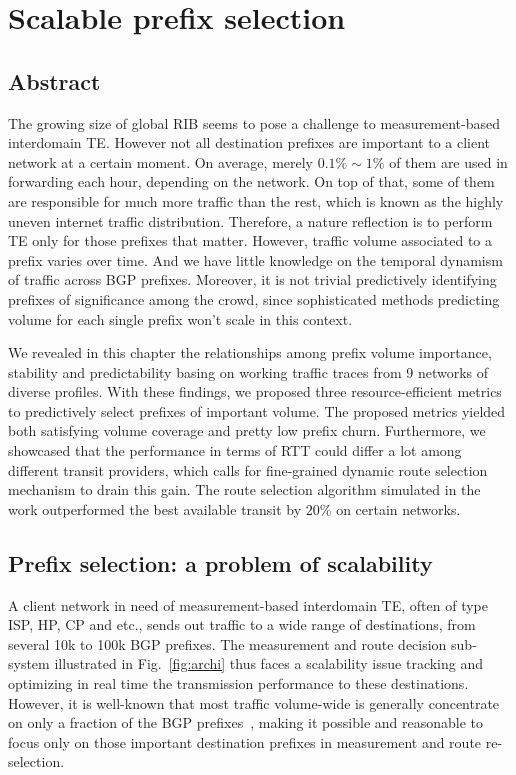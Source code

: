 \chapter{Scalable prefix selection}
\label{sec:pref_selec}

\section*{Abstract}
The growing size of global \acf{RIB} seems to pose a challenge to measurement-based interdomain \acf{TE}. However not all destination prefixes are important to a client network at a certain moment. On average, merely $0.1\% \sim 1\%$ of them are used in forwarding each hour, depending on the network. On top of that, some of them are responsible for much more traffic than the rest, which is known as the highly uneven internet traffic distribution.
Therefore, a nature reflection is to perform TE only for those prefixes that matter.
However, traffic volume associated to a prefix varies over time. And we have little knowledge on the temporal dynamism of traffic across \acf{BGP} prefixes. 
Moreover, it is not trivial predictively identifying prefixes of significance among the crowd, since sophisticated methods predicting volume for each single prefix won't scale in this context.

We revealed in this chapter the relationships among prefix volume importance, stability and predictability basing on working traffic traces from 9 networks of diverse profiles. 
With these findings, we proposed three resource-efficient metrics to predictively select prefixes of important volume. The proposed metrics yielded both satisfying volume coverage and pretty low prefix churn. Furthermore, we showcased that the performance in terms of RTT could differ a lot among different transit providers, which calls for fine-grained dynamic route selection mechanism to drain this gain. The route selection algorithm simulated in the work outperformed the best available transit by $20\%$ on certain networks. 
\clearpage

\section{Prefix selection: a problem of scalability}
A client network in need of measurement-based interdomain \acf{TE}, often of type \acf{ISP}, \acf{HP}, \acf{CP} and etc., sends out traffic to a wide range of destinations, from several 10k to 100k BGP prefixes.
The measurement and route decision sub-system illustrated in Fig.~\ref{fig:archi} thus faces a scalability issue tracking and optimizing in real time the transmission performance to these destinations.
However, it is well-known that most traffic volume-wide is generally concentrate on only a fraction of the BGP prefixes~\cite{Fang1999, Feamster2003, Papagiannaki2005, Sarrar2012}, 
making it possible and reasonable to focus only on those important destination prefixes in measurement and route re-selection. 

